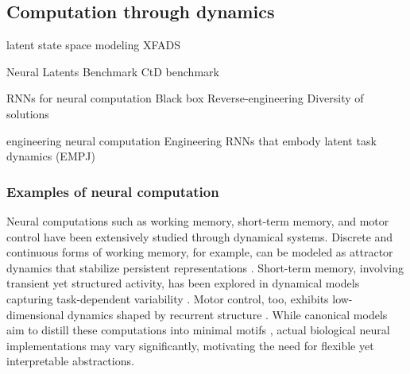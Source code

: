 \documentclass{article}
\theoremstyle{definition} \newtheorem{definition}{Definition}  \newtheorem{example}{Example}
\theoremstyle{remark} \newtheorem{remark}{Remark}
\newcounter{ct}
\begin{document}
\subsection{Computation through dynamics}\label{sec:ctd}
\citep{mante2013context}
\citep{sussillo2014neural}
\citep{vyas2020ctd}
\citep{versteeg2023expressive, sedler2023expressive}
\citep{dinc2025latentcomputing}

latent state space modeling \citep{zoltowski2020general} 
XFADS\citep{Dowling2024b}

Neural Latents Benchmark \citep{pei2neural}
CtD benchmark \citep{versteeg2025computation}

RNNs for neural computation \citep{chaisangmongkon2017transience}
Black box \citep{sussillo2013blackbox}
Reverse-engineering \citep{maheswaranathan2019reverse} \citep{golub2018fixedpointfinder} \citep{smith2021reverse} \citep{rivkind2017local}
Diversity of solutions \citep{maheswaranathan2019universality}\citep{jarne2023initialization} \citep{turner2021charting} \citep{nayebi2021heterogeneity} \citep{zhong2023mechanistic}

engineering neural computation \citep{eliasmith2003neuralengineering, eliasmith2005unified, eliasmith2010describe} \citep{beiran2023rnns}
Engineering RNNs that embody latent task dynamics (EMPJ) \citep{pollock2020engineering}


\subsubsection{Examples of neural computation}\label{sec:neurcompex}
Neural computations such as working memory, short-term memory, and motor control have been extensively studied through dynamical systems. Discrete and continuous forms of working memory, for example, can be modeled as attractor dynamics that stabilize persistent representations \citep{zhang2022translation, hoeller2024bridging}.
 Short-term memory, involving transient yet structured activity, has been explored in dynamical models capturing task-dependent variability \citep{kurtkaya2025dynamical}.
 Motor control, too, exhibits low-dimensional dynamics shaped by recurrent structure \citep{wang2022representation}.
 While canonical models aim to distill these computations into minimal motifs \citep{chirimuuta2014minimal}, actual biological neural implementations may vary significantly, motivating the need for flexible yet interpretable abstractions.
\end{document}
